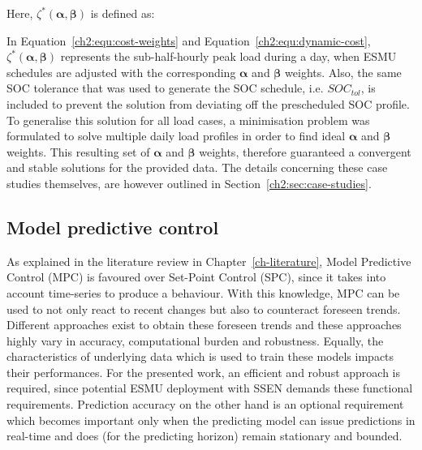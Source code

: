 

Here, $\zeta^*(\boldsymbol{\alpha}, \boldsymbol{\beta})$ is defined as:



In Equation~\ref{ch2:equ:cost-weights} and Equation~\ref{ch2:equ:dynamic-cost}, $\zeta^*(\boldsymbol{\alpha}, \boldsymbol{\beta})$ represents the sub-half-hourly peak load during a day, when ESMU schedules are adjusted with the corresponding $\boldsymbol{\alpha}$ and $\boldsymbol{\beta}$ weights.
Also, the same SOC tolerance that was used to generate the SOC schedule, i.e. $SOC_{tol}$, is included to prevent the solution from deviating off the prescheduled SOC profile.
To generalise this solution for all load cases, a minimisation problem was formulated to solve multiple daily load profiles in order to find ideal $\boldsymbol{\alpha}$ and $\boldsymbol{\beta}$ weights.
This resulting set of $\boldsymbol{\alpha}$ and $\boldsymbol{\beta}$ weights, therefore guaranteed a convergent and stable solutions for the provided data.
The details concerning these case studies themselves, are however outlined in Section~\ref{ch2:sec:case-studies}.

\subsection{Model predictive control}

As explained in the literature review in Chapter~\ref{ch-literature}, Model Predictive Control (MPC) is favoured over Set-Point Control (SPC), since it takes into account time-series to produce a behaviour.
With this knowledge, MPC can be used to not only react to recent changes but also to counteract foreseen trends.
Different approaches exist to obtain these foreseen trends and these approaches highly vary in accuracy, computational burden and robustness.
Equally, the characteristics of underlying data which is used to train these models impacts their performances.
For the presented work, an efficient and robust approach is required, since potential ESMU deployment with SSEN demands these functional requirements.
Prediction accuracy on the other hand is an optional requirement which becomes important only when the predicting model can issue predictions in real-time and does (for the predicting horizon) remain stationary and bounded.

